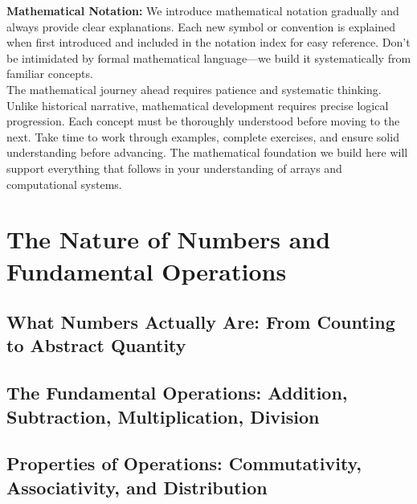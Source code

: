 \documentclass[12pt, oneside, openany]{book}
\let\oldchapter\chapter
\renewcommand{\chapter}{
	\cleardoublepage
	\thispagestyle{chapter}
	\oldchapter
}
\begin{document}
\textbf{Mathematical Notation:} We introduce mathematical notation gradually and always provide clear explanations. Each new symbol or convention is explained when first introduced and included in the notation index for easy reference. Don't be intimidated by formal mathematical language—we build it systematically from familiar concepts.\\
The mathematical journey ahead requires patience and systematic thinking. Unlike historical narrative, mathematical development requires precise logical progression. Each concept must be thoroughly understood before moving to the next. Take time to work through examples, complete exercises, and ensure solid understanding before advancing. The mathematical foundation we build here will support everything that follows in your understanding of arrays and computational systems.


\chapter{The Nature of Numbers and Fundamental Operations}

\section{What Numbers Actually Are: From Counting to Abstract Quantity}

\section{The Fundamental Operations: Addition, Subtraction, Multiplication, Division}

\section{Properties of Operations: Commutativity, Associativity, and Distribution}
\end{document}
